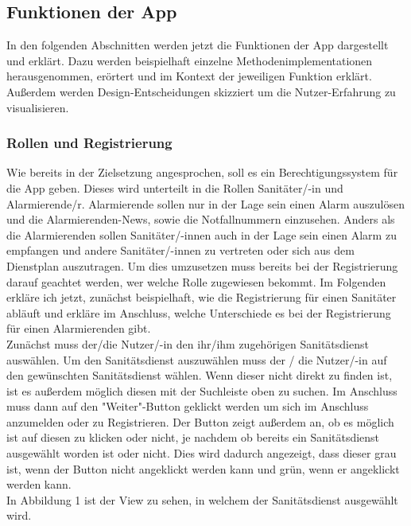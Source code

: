 \subsection{Funktionen der App}
        In den folgenden Abschnitten werden jetzt die Funktionen der App dargestellt 
        und erklärt. Dazu werden beispielhaft einzelne Methodenimplementationen 
        herausgenommen, erörtert und im Kontext der jeweiligen Funktion erklärt.
        Außerdem werden Design-Entscheidungen skizziert um die Nutzer-Erfahrung zu 
        visualisieren.   
        
\subsubsection{Rollen und Registrierung}
        Wie bereits in der Zielsetzung angesprochen, soll es ein Berechtigungssystem 
        für die App geben. Dieses wird unterteilt in die Rollen Sanitäter/-in und 
        Alarmierende/r. Alarmierende sollen nur in der Lage sein einen Alarm 
        auszulösen und die Alarmierenden-News, sowie die Notfallnummern einzusehen.
        Anders als die Alarmierenden sollen Sanitäter/-innen auch in der Lage sein 
        einen Alarm zu empfangen und andere Sanitäter/-innen zu vertreten oder sich 
        aus dem Dienstplan auszutragen. Um dies umzusetzen muss bereits bei der 
        Registrierung darauf geachtet werden, wer welche Rolle zugewiesen bekommt.
        Im Folgenden erkläre ich jetzt, zunächst beispielhaft, wie die Registrierung 
        für einen Sanitäter abläuft und erkläre im Anschluss, welche Unterschiede es 
        bei der Registrierung für einen Alarmierenden gibt.
        \newline\\
        Zunächst muss der/die Nutzer/-in den ihr/ihm zugehörigen Sanitätsdienst 
        auswählen. Um den Sanitätsdienst auszuwählen muss der / die Nutzer/-in auf 
        den gewünschten Sanitätsdienst wählen. Wenn dieser nicht direkt zu finden 
        ist, ist es außerdem möglich diesen mit der Suchleiste oben zu suchen. Im 
        Anschluss muss dann auf den "Weiter"-Button geklickt werden um sich im 
        Anschluss anzumelden oder zu Registrieren. Der Button zeigt außerdem an, ob es
        möglich ist auf diesen zu klicken oder nicht, je nachdem ob bereits ein 
        Sanitätsdienst ausgewählt worden ist oder nicht. Dies wird dadurch angezeigt, 
        dass dieser grau ist, wenn der Button nicht angeklickt werden kann und grün, 
        wenn er angeklickt werden kann. \\In Abbildung 1 ist der View zu sehen, 
        in welchem der Sanitätsdienst ausgewählt wird.
        

